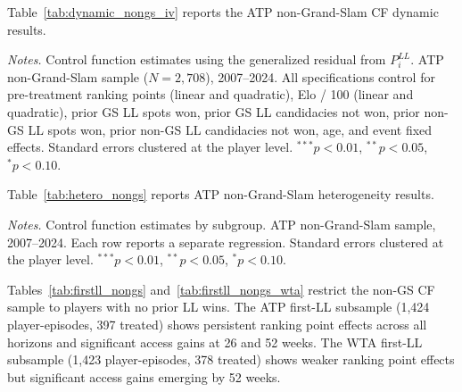 Table~\ref{tab:dynamic_nongs_iv} reports the ATP non-Grand-Slam CF dynamic results.

\begin{table}[htbp]
\centering
\caption{ATP Non-Grand-Slam: Dynamic Effects (Stacked, Control Function)}
\label{tab:dynamic_nongs_iv}
\begin{threeparttable}
\small

\begin{tablenotes}
\footnotesize
\item \textit{Notes.} Control function estimates using the generalized residual from $P_i^{LL}$. ATP non-Grand-Slam sample ($N = 2{,}708$), 2007--2024. All specifications control for pre-treatment ranking points (linear and quadratic), Elo / 100 (linear and quadratic), prior GS LL spots won, prior GS LL candidacies not won, prior non-GS LL spots won, prior non-GS LL candidacies not won, age, and event fixed effects. Standard errors clustered at the player level. $^{***}p<0.01$, $^{**}p<0.05$, $^{*}p<0.10$.
\end{tablenotes}
\end{threeparttable}
\end{table}

Table~\ref{tab:hetero_nongs} reports ATP non-Grand-Slam heterogeneity results.

\begin{table}[htbp]
\centering
\caption{ATP Non-Grand-Slam: Heterogeneous Effects (Control Function)}
\label{tab:hetero_nongs}
\begin{threeparttable}
\small

\begin{tablenotes}
\footnotesize
\item \textit{Notes.} Control function estimates by subgroup. ATP non-Grand-Slam sample, 2007--2024. Each row reports a separate regression. Standard errors clustered at the player level. $^{***}p<0.01$, $^{**}p<0.05$, $^{*}p<0.10$.
\end{tablenotes}
\end{threeparttable}
\end{table}

Tables~\ref{tab:firstll_nongs} and~\ref{tab:firstll_nongs_wta} restrict the non-GS CF sample to players with no prior LL wins. The ATP first-LL subsample (1,424 player-episodes, 397 treated) shows persistent ranking point effects across all horizons and significant access gains at 26 and 52 weeks. The WTA first-LL subsample (1,423 player-episodes, 378 treated) shows weaker ranking point effects but significant access gains emerging by 52 weeks.

